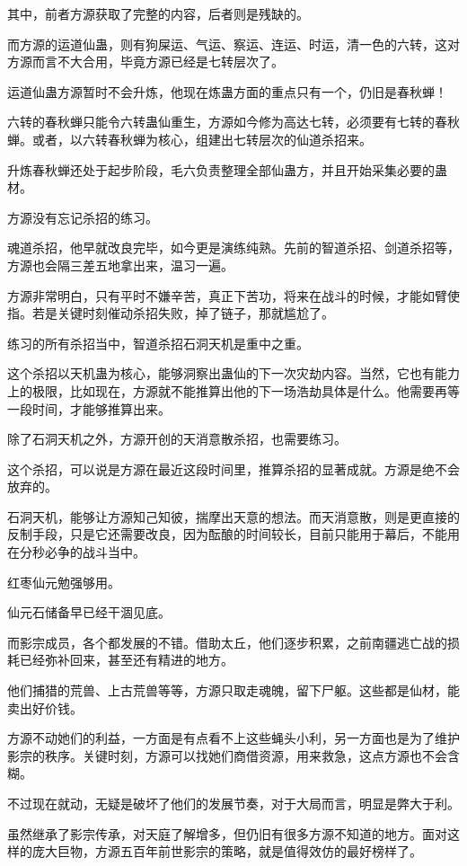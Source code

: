 \begin{this_body}
其中，前者方源获取了完整的内容，后者则是残缺的。

而方源的运道仙蛊，则有狗屎运、气运、察运、连运、时运，清一色的六转，这对方源而言不大合用，毕竟方源已经是七转层次了。

运道仙蛊方源暂时不会升炼，他现在炼蛊方面的重点只有一个，仍旧是春秋蝉！

六转的春秋蝉只能令六转蛊仙重生，方源如今修为高达七转，必须要有七转的春秋蝉。或者，以六转春秋蝉为核心，组建出七转层次的仙道杀招来。

升炼春秋蝉还处于起步阶段，毛六负责整理全部仙蛊方，并且开始采集必要的蛊材。

方源没有忘记杀招的练习。

魂道杀招，他早就改良完毕，如今更是演练纯熟。先前的智道杀招、剑道杀招等，方源也会隔三差五地拿出来，温习一遍。

方源非常明白，只有平时不嫌辛苦，真正下苦功，将来在战斗的时候，才能如臂使指。若是关键时刻催动杀招失败，掉了链子，那就尴尬了。

练习的所有杀招当中，智道杀招石洞天机是重中之重。

这个杀招以天机蛊为核心，能够洞察出蛊仙的下一次灾劫内容。当然，它也有能力上的极限，比如现在，方源就不能推算出他的下一场浩劫具体是什么。他需要再等一段时间，才能够推算出来。

除了石洞天机之外，方源开创的天消意散杀招，也需要练习。

这个杀招，可以说是方源在最近这段时间里，推算杀招的显著成就。方源是绝不会放弃的。

石洞天机，能够让方源知己知彼，揣摩出天意的想法。而天消意散，则是更直接的反制手段，只是它还需要改良，因为酝酿的时间较长，目前只能用于幕后，不能用在分秒必争的战斗当中。

红枣仙元勉强够用。

仙元石储备早已经干涸见底。

而影宗成员，各个都发展的不错。借助太丘，他们逐步积累，之前南疆逃亡战的损耗已经弥补回来，甚至还有精进的地方。

他们捕猎的荒兽、上古荒兽等等，方源只取走魂魄，留下尸躯。这些都是仙材，能卖出好价钱。

方源不动她们的利益，一方面是有点看不上这些蝇头小利，另一方面也是为了维护影宗的秩序。关键时刻，方源可以找她们商借资源，用来救急，这点方源也不会含糊。

不过现在就动，无疑是破坏了他们的发展节奏，对于大局而言，明显是弊大于利。

虽然继承了影宗传承，对天庭了解增多，但仍旧有很多方源不知道的地方。面对这样的庞大巨物，方源五百年前世影宗的策略，就是值得效仿的最好榜样了。


\end{this_body}
